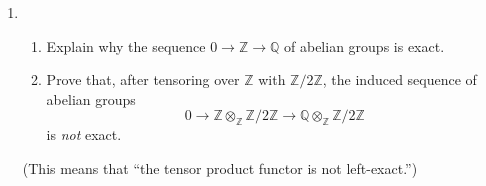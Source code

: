 \documentclass[11pt]{article}
\begin{document}
\begin{enumerate}
\item \begin{enumerate}
\item Explain why the sequence $0 \to \mathbb{Z} \to \mathbb{Q}$ of abelian groups is exact.
\item Prove that, after tensoring over $\mathbb{Z}$ with $\mathbb{Z}/2\mathbb{Z}$, the induced sequence of abelian groups
\[0 \to \mathbb{Z} \otimes_{\mathbb{Z}} \mathbb{Z}/2\mathbb{Z} \to \mathbb{Q} \otimes_{\mathbb{Z}} \mathbb{Z}/2\mathbb{Z}\]
 is \emph{not} exact.
\end{enumerate}
(This means that ``the tensor product functor is not left-exact.'')



\end{enumerate}
\end{document}
